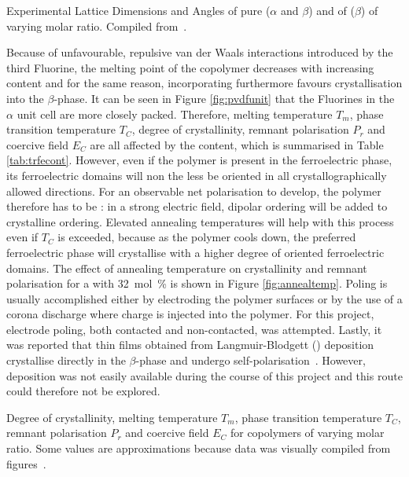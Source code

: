 \begin{table}
\centering
\caption[Experimental Lattice Dimensions and Angles of pure \pvdf{} ($\alpha$ and $\beta$) and of \pvfe{} ($\beta$) of varying molar ratio.]{Experimental Lattice Dimensions and Angles of pure \pvdf{} ($\alpha$ and $\beta$) and of \pvfe{} ($\beta$) of varying molar ratio. Compiled from~\cite[p. 810]{encyclopedia}.}
\label{tab:pvdflat}

\end{table}
Because of unfavourable, repulsive van der Waals interactions introduced by the third Fluorine, the melting point of the copolymer decreases with increasing \trfe{} content and for the same reason, incorporating \trfe{} furthermore favours crystallisation into the $\beta$-phase. It can be seen in Figure \ref{fig:pvdfunit} that the Fluorines in the $\alpha$ unit cell are more closely packed. Therefore, melting temperature $T_m$, phase transition temperature $T_C$, degree of crystallinity, remnant polarisation $P_r$ and coercive field $E_C$ are all affected by the \trfe{} content, which is summarised in Table \ref{tab:trfecont}. However, even if the polymer is present in the ferroelectric phase, its ferroelectric domains will non the less be oriented in all crystallographically allowed directions. For an observable net polarisation to develop, the polymer therefore has to be : in a strong electric field, dipolar ordering will be added to crystalline ordering. Elevated annealing temperatures will help with this process even if $T_C$ is exceeded, because as the polymer cools down, the preferred ferroelectric phase will crystallise with a higher degree of oriented ferroelectric domains. The effect of annealing temperature on crystallinity and remnant polarisation for a \pvfe{} with \SI{32}{\mole\percent} \trfe{} is shown in Figure \ref{fig:annealtemp}. Poling is usually accomplished either by electroding the polymer surfaces or by the use of a corona discharge where charge is injected into the polymer. For this project, electrode poling, both contacted and non-contacted, was attempted. Lastly, it was reported that \pvdf{} thin films obtained from Langmuir-Blodgett (\lb{}) deposition crystallise directly in the $\beta$-phase and undergo self-polarisation~\cite{chen_lbpvdf,kliem_lbpvdf}. However, \lb{} deposition was not easily available during the course of this project and this route could therefore not be explored.
\begin{table}
\centering
\caption[Degree of crystallinity, melting temperature $T_m$, phase transition temperature $T_C$, remnant polarisation $P_r$ and coercive field $E_C$ for \pvfe{} copolymers of varying molar ratio.]{Degree of crystallinity, melting temperature $T_m$, phase transition temperature $T_C$, remnant polarisation $P_r$ and coercive field $E_C$ for \pvfe{} copolymers of varying molar ratio. Some values are approximations because data was visually compiled from figures~\cite[pp. 812 f.]{encyclopedia}.}
\label{tab:trfecont}

\end{table}
